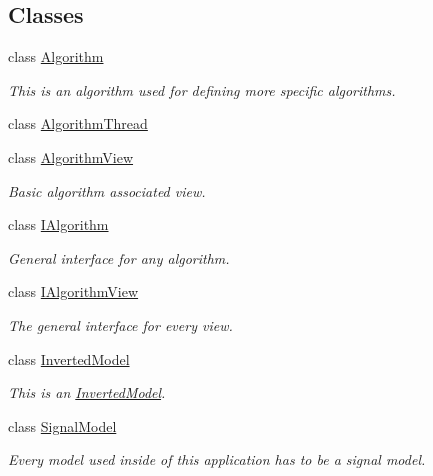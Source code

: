 \subsection*{Classes}
\begin{DoxyCompactItemize}
\item 
class \hyperlink{classuanc_1_1amv_1_1_algorithm}{Algorithm}
\begin{DoxyCompactList}\small\item\em This is an algorithm used for defining more specific algorithms. \end{DoxyCompactList}\item 
class \hyperlink{classuanc_1_1amv_1_1_algorithm_thread}{Algorithm\+Thread}
\item 
class \hyperlink{classuanc_1_1amv_1_1_algorithm_view}{Algorithm\+View}
\begin{DoxyCompactList}\small\item\em Basic algorithm associated view. \end{DoxyCompactList}\item 
class \hyperlink{classuanc_1_1amv_1_1_i_algorithm}{I\+Algorithm}
\begin{DoxyCompactList}\small\item\em General interface for any algorithm. \end{DoxyCompactList}\item 
class \hyperlink{classuanc_1_1amv_1_1_i_algorithm_view}{I\+Algorithm\+View}
\begin{DoxyCompactList}\small\item\em The general interface for every view. \end{DoxyCompactList}\item 
class \hyperlink{classuanc_1_1amv_1_1_inverted_model}{Inverted\+Model}
\begin{DoxyCompactList}\small\item\em This is an \hyperlink{classuanc_1_1amv_1_1_inverted_model}{Inverted\+Model}. \end{DoxyCompactList}\item 
class \hyperlink{classuanc_1_1amv_1_1_signal_model}{Signal\+Model}
\begin{DoxyCompactList}\small\item\em Every model used inside of this application has to be a signal model. \end{DoxyCompactList}\end{DoxyCompactItemize}
